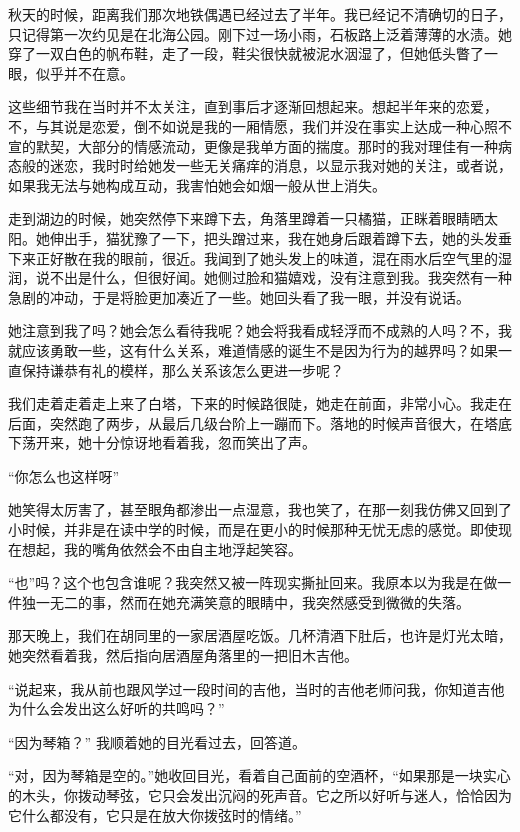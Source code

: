 秋天的时候，距离我们那次地铁偶遇已经过去了半年。我已经记不清确切的日子，只记得第一次约见是在北海公园。刚下过一场小雨，石板路上泛着薄薄的水渍。她穿了一双白色的帆布鞋，走了一段，鞋尖很快就被泥水洇湿了，但她低头瞥了一眼，似乎并不在意。

这些细节我在当时并不太关注，直到事后才逐渐回想起来。想起半年来的恋爱，不，与其说是恋爱，倒不如说是我的一厢情愿，我们并没在事实上达成一种心照不宣的默契，大部分的情感流动，更像是我单方面的揣度。那时的我对理佳有一种病态般的迷恋，我时时给她发一些无关痛痒的消息，以显示我对她的关注，或者说，如果我无法与她构成互动，我害怕她会如烟一般从世上消失。

走到湖边的时候，她突然停下来蹲下去，角落里蹲着一只橘猫，正眯着眼睛晒太阳。她伸出手，猫犹豫了一下，把头蹭过来，我在她身后跟着蹲下去，她的头发垂下来正好散在我的眼前，很近。我闻到了她头发上的味道，混在雨水后空气里的湿润，说不出是什么，但很好闻。她侧过脸和猫嬉戏，没有注意到我。我突然有一种急剧的冲动，于是将脸更加凑近了一些。她回头看了我一眼，并没有说话。

她注意到我了吗？她会怎么看待我呢？她会将我看成轻浮而不成熟的人吗？不，我就应该勇敢一些，这有什么关系，难道情感的诞生不是因为行为的越界吗？如果一直保持谦恭有礼的模样，那么关系该怎么更进一步呢？

我们走着走着走上来了白塔，下来的时候路很陡，她走在前面，非常小心。我走在后面，突然跑了两步，从最后几级台阶上一蹦而下。落地的时候声音很大，在塔底下荡开来，她十分惊讶地看着我，忽而笑出了声。

“你怎么也这样呀”

她笑得太厉害了，甚至眼角都渗出一点湿意，我也笑了，在那一刻我仿佛又回到了小时候，并非是在读中学的时候，而是在更小的时候那种无忧无虑的感觉。即使现在想起，我的嘴角依然会不由自主地浮起笑容。

“也”吗？这个也包含谁呢？我突然又被一阵现实撕扯回来。我原本以为我是在做一件独一无二的事，然而在她充满笑意的眼睛中，我突然感受到微微的失落。

那天晚上，我们在胡同里的一家居酒屋吃饭。几杯清酒下肚后，也许是灯光太暗，她突然看着我，然后指向居酒屋角落里的一把旧木吉他。

“说起来，我从前也跟风学过一段时间的吉他，当时的吉他老师问我，你知道吉他为什么会发出这么好听的共鸣吗？”

“因为琴箱？” 我顺着她的目光看过去，回答道。

“对，因为琴箱是空的。”她收回目光，看着自己面前的空酒杯，“如果那是一块实心的木头，你拨动琴弦，它只会发出沉闷的死声音。它之所以好听与迷人，恰恰因为它什么都没有，它只是在放大你拨弦时的情绪。”

